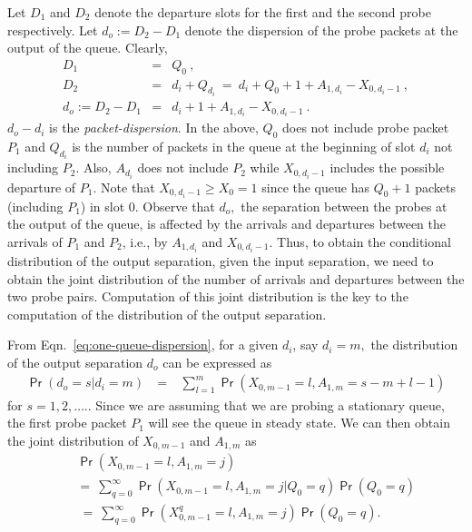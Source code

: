 \documentclass[11pt]{article}
\newcommand{\prob}[1]{\mathsf{\Pr}\left(#1\right)}
\begin{document}
Let $D_1$ and $D_2$ denote the departure slots for the first and the
second probe respectively. Let $d_o := D_2 - D_1$ denote the
dispersion of the probe packets at the output of the queue.  Clearly,
\begin{eqnarray}
  D_1 &=& Q_0  \ , \nonumber \\
  D_2 &=& d_i + Q_{d_i} \ = \ d_i + Q_0 + 1 + A_{1,d_i} - X_{0,d_i-1}
  \ , \nonumber \\  
  d_o := D_2 - D_1 &=& d_i + 1 + A_{1,d_i} - X_{0,d_i-1}  \ .
  \label{eq:one-queue-dispersion}
\end{eqnarray}
$d_o-d_i$ is the \emph{packet-dispersion}. In the above, $Q_0$ does
not include probe packet $P_1$ and $Q_{d_i}$ is the number of packets
in the queue at the beginning of slot $d_i$ not including $P_2.$ Also,
$A_{d_i}$ does not include $P_2$ while $X_{0,d_i-1}$ includes the
possible departure of $P_1.$ Note that $X_{0,d_i-1} \geq X_0 =1$ since
the queue has $Q_0+1$ packets (including $P_1$) in slot $0.$ Observe
that $d_o,$ the separation between the probes at the output of the
queue, is affected by the arrivals and departures between the arrivals
of $P_1$ and $P_2$, i.e., by $A_{1,d_i}$ and $X_{0,d_i-1}.$ Thus, to
obtain the conditional distribution of the output separation, given
the input separation, we need to obtain the joint distribution of the
number of arrivals and departures between the two probe pairs.
Computation of this joint distribution is the key to the computation
of the distribution of the output separation.

From Eqn.~\ref{eq:one-queue-dispersion}, for a given $d_i$, say
$d_i=m,$ the distribution of the output separation $d_o$ can be
expressed as
\begin{eqnarray}
  \prob{d_o=s|d_i=m} & \ = \ & \sum_{l=1}^m \prob{X_{0,m-1}=l,
    A_{1,m}=s-m+l-1} 
  \label{eq:d_o-conditional}
\end{eqnarray}
for $s=1,2,\ldots.$.  Since we are assuming that we are probing a 
stationary queue, the first probe packet $P_1$ will see the queue in
steady state. We can then obtain the joint distribution of $X_{0,m-1}$
and $A_{1,m}$ as
\begin{eqnarray}
  && \prob{X_{0,m-1}=l, A_{1,m}=j } \  \ \nonumber \\
  && = \ \sum_{q=0}^{\infty}
  \prob{X_{0,m-1}=l, A_{1,m}=j | Q_0=q}  \prob{Q_0=q}  \nonumber\\ 
  && \ = \ \sum_{q=0}^{\infty}  \prob{X^q_{0,m-1}=l, A_{1,m}=j}
  \prob{Q_0=q} .
  \label{eq:X_m-A_a,m-joint-distbn}
\end{eqnarray}
\end{document}
